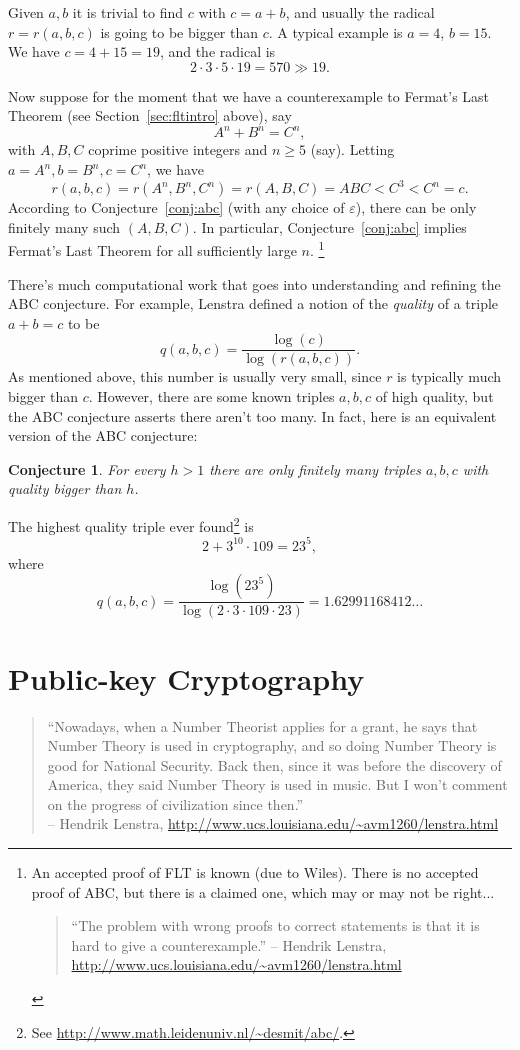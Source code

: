 \documentclass{book}
\theoremstyle{plain}
\newtheorem{conjecture}[theorem]{Conjecture}
\theoremstyle{definition}
\numberwithin{equation}{section}
\numberwithin{figure}{section}
\numberwithin{table}{section}
\newcommand{\eps}{\varepsilon}
\begin{document}
Given $a,b$ it is trivial to find $c$ with $c=a+b$, and
usually the radical $r=r(a,b,c)$ is going to be bigger
than $c$.   A typical example is $a=4$, $b=15$.
We have $c=4+15=19$, and the radical is
$$2\cdot 3\cdot5\cdot19=570 \gg 19.$$

Now suppose for the moment that we have a counterexample
to Fermat's Last Theorem (see Section~\ref{sec:fltintro} above),
say
$$
 A^n + B^n = C^n,
$$
with $A,B,C$ coprime positive integers and $n\ge 5$ (say).
Letting $a=A^n, b=B^n, c=C^n$, we have
$$
r(a,b,c) = r(A^n,B^n,C^n) = r(A,B,C) = ABC <C^3 < C^n=c.
$$
According to Conjecture~\ref{conj:abc} (with
any choice of $\eps$), there can be only finitely many such
$(A,B,C)$.  In particular, Conjecture~\ref{conj:abc} implies
Fermat's Last Theorem for all sufficiently large $n$.
\footnote{An accepted proof of FLT is known (due to Wiles). There
is no accepted proof of ABC, but there is a claimed one,
which may or may not be right...
\begin{quote}
``The problem with wrong proofs to correct statements is that it is hard to give a counterexample.'' -- Hendrik Lenstra, \url{http://www.ucs.louisiana.edu/~avm1260/lenstra.html}
\end{quote}}

There's much computational work that goes into understanding
and refining the ABC conjecture.  For example,
Lenstra defined a notion of the {\em quality} of
a triple $a+b=c$ to be
$$q(a,b,c) = \frac{\log(c)}{\log(r(a,b,c))}.$$
As mentioned above, this number is usually very small, since
$r$ is typically much bigger than $c$.
However, there are some known triples $a,b,c$ of
high quality, but the ABC conjecture asserts there aren't too
many.  In fact, here is an equivalent version of the ABC conjecture:
\begin{conjecture}
For every $h>1$ there are only finitely many triples
$a,b,c$ with quality bigger than $h$.
\end{conjecture}

The highest quality triple ever found\footnote{See \url{http://www.math.leidenuniv.nl/~desmit/abc/}.} is
$$
   2 + 3^{10}\cdot 109 = 23^5,
$$
where
$$
q(a,b,c) = \frac{\log(23^5)}{\log(2\cdot 3 \cdot 109 \cdot 23)}
    = 1.62991168412\ldots
$$


\section{Public-key Cryptography}


\begin{quote}
``Nowadays, when a Number Theorist applies for a grant, he says
that Number Theory is used in cryptography, and so doing Number
Theory is good for National Security. Back then, since it was
before the discovery of America, they said Number Theory is
used in music. But I won't comment on the progress of
civilization since then.''\\-- Hendrik Lenstra, \url{http://www.ucs.louisiana.edu/~avm1260/lenstra.html}
\end{quote}
\end{document}
